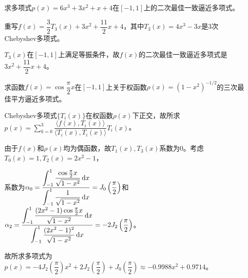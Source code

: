     \begin{homework}[5pts]
        求多项式$p(x)=6x^3+3x^2+x+4$在$[-1,1]$上的二次最佳一致逼近多项式。
    \end{homework}

    \begin{solution}
        重写$f(x)=\dfrac32T_3(x)+3x^2+\dfrac{11}2x+4$，其中$T_3(x)=4x^3-3x$是3次Chebyshev多项式。

        $T_3(x)$在$[-1,1]$上满足等振条件，故$f(x)$的二次最佳一致逼近多项式是$3x^2+\dfrac{11}2x+4$。
    \end{solution}

    \begin{homework}[5pts]
        求函数$f(x)=\cos \dfrac{\pi}{2}x$在$[-1,1]$上关于权函数$\rho(x)=(1-x^2)^{-1/2}$的三次最佳平方逼近多项式。
    \end{homework}

    \begin{solution}
        Chebyshev多项式$\{T_i(x)\}$在权函数$\rho(x)$下正交，故所求$p(x)=\sum_{k=0}^3 \dfrac{\langle f(x),T_i(x) \rangle}{\langle T_i(x), T_i(x) \rangle}T_i(x)$。

        由于$f(x)$和$\rho(x)$均为偶函数，故$T_1(x),T_3(x)$系数为0。考虑$T_0(x)=1,T_2(x)=2x^2-1$，

        系数为$\alpha_0=\dfrac{\displaystyle\int_{-1}^1 \dfrac{\cos\tfrac{\pi}2 x}{\sqrt{1-x^2}}\mathop{}\!\mathrm{d} x}{\displaystyle\int_{-1}^1 \dfrac1{\sqrt{1-x^2}}\mathop{}\!\mathrm{d} x}=J_0\left(\dfrac{\pi}{2}\right)$和$\alpha_2=\dfrac{\displaystyle\int_{-1}^1 \dfrac{(2x^2-1)\cos\tfrac{\pi}2 x}{\sqrt{1-x^2}}\mathop{}\!\mathrm{d} x}{\displaystyle\int_{-1}^1 \dfrac{(2x^2-1)^2}{\sqrt{1-x^2}}\mathop{}\!\mathrm{d} x}=-2J_2\left(\dfrac{\pi}{2}\right)$。

        故所求多项式为$p(x)=-4J_2\left(\dfrac{\pi}{2}\right)x^2+2J_2\left(\dfrac{\pi}{2}\right)+J_0\left(\dfrac{\pi}{2}\right)\approx -0.9988x^2+0.9714$。
    \end{solution}

